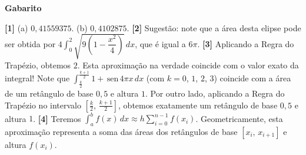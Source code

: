 \documentclass[12pt,a4paper]{article}
\newcommand{\sen}{\,\textrm{sen}\,}
\begin{document}
\begin{center}
\textbf{Gabarito}
\end{center} 
\textbf{[1]} (a) $0,41559375$. (b) $0,4102875$. 
\textbf{[2]} Sugestão: note que a área desta elipse pode ser obtida por $\displaystyle 4\int_0^2 \sqrt{9\left(1 - \dfrac{x^2}{4}\right)}\,dx$, que é 
igual a $6\pi$. 
\textbf{[3]} Aplicando a Regra do Trapézio, obtemos $2$. Esta aproximação na verdade coincide com o valor exato da integral! Note que 
$\displaystyle \int_{\frac{k}{2}}^{\frac{k+1}{2}} 1 + \sen 4\pi x\,dx$ (com $k = 0$, $1$, $2$, $3$) coincide com a área de um retângulo de base $0,5$ e altura $1$. 
Por outro lado, aplicando a Regra do Trapézio no intervalo $\left[\frac{k}{2},\,\frac{k+1}{2}\right]$, obtemos exatamente um retângulo de base $0,5$ e altura $1$. 
\textbf{[4]} Teremos $\displaystyle\int_a^b f(x)\,dx \approx h\sum_{i=0}^{n-1}f(x_i)$. Geometricamente, esta aproximação representa a soma das áreas dos retângulos de base $[x_i,\,x_{i+1}]$ e altura $f(x_i)$. 
\end{document}
